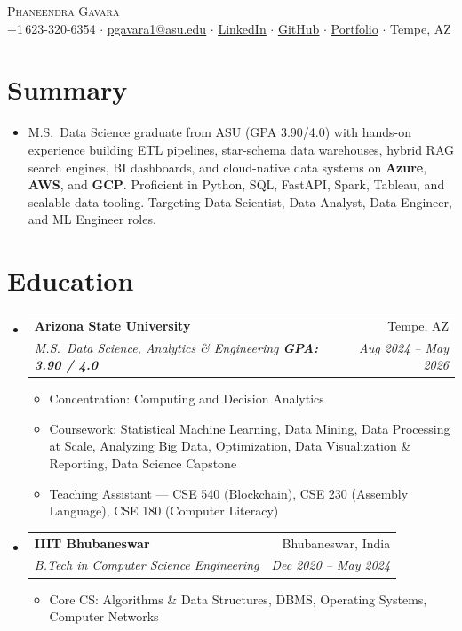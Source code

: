 \documentclass[letterpaper,10pt]{article}
\makeatletter
\newcommand{\resumeItem}[1]{\item\small{#1\vspace{-2pt}}}
\newcommand{\resumeSubheading}[4]{
  \vspace{-2pt}\item
  \begin{tabular*}{0.97\textwidth}[t]{l@{\extracolsep{\fill}}r}
    \textbf{\small#1} & \small#2 \\
    \textit{\small#3} & \textit{\small#4} \\
  \end{tabular*}\vspace{-6pt}
}
\newcommand{\resumeSubHL}{\begin{itemize}[leftmargin=0.12in,label={}]}
\newcommand{\resumeSubHLE}{\end{itemize}}
\newcommand{\resumeIL}{\begin{itemize}[leftmargin=0.18in,topsep=1pt,itemsep=0pt]}
\newcommand{\resumeILE}{\end{itemize}\vspace{-3pt}}
\makeatother
\begin{document}
\begin{center}
  {\LARGE\scshape Phaneendra Gavara}\\[3pt]
  \small
  +1\,623-320-6354 $\cdot$
  \href{mailto:pgavara1@asu.edu}{\underline{pgavara1@asu.edu}} $\cdot$
  \href{https://www.linkedin.com/in/phaneendra-gavara}{\underline{LinkedIn}} $\cdot$
  \href{https://github.com/PHANI465}{\underline{GitHub}} $\cdot$
  \href{https://phaneendragavara.dev/}{\underline{Portfolio}} $\cdot$
  Tempe, AZ
\end{center}

\vspace{-2pt}

\section{Summary}
\begin{itemize}[leftmargin=0.12in,label={},topsep=0pt]
  \small\item{
    M.S.\ Data Science graduate from ASU (GPA 3.90/4.0) with hands-on experience building ETL pipelines, star-schema data warehouses, hybrid RAG search engines, BI dashboards, and cloud-native data systems on \textbf{Azure}, \textbf{AWS}, and \textbf{GCP}. Proficient in Python, SQL, FastAPI, Spark, Tableau, and scalable data tooling. Targeting Data Scientist, Data Analyst, Data Engineer, and ML Engineer roles.
  }
\end{itemize}

\section{Education}
\resumeSubHL
  \resumeSubheading
    {Arizona State University}{Tempe, AZ}
    {M.S.\ Data Science, Analytics \& Engineering \quad \textbf{GPA: 3.90 / 4.0}}{Aug 2024 -- May 2026}
    \resumeIL
      \resumeItem{Concentration: Computing and Decision Analytics}
      \resumeItem{Coursework: Statistical Machine Learning, Data Mining, Data Processing at Scale, Analyzing Big Data, Optimization, Data Visualization \& Reporting, Data Science Capstone}
      \resumeItem{Teaching Assistant --- CSE 540 (Blockchain), CSE 230 (Assembly Language), CSE 180 (Computer Literacy)}
    \resumeILE
  \resumeSubheading
    {IIIT Bhubaneswar}{Bhubaneswar, India}
    {B.Tech in Computer Science Engineering}{Dec 2020 -- May 2024}
    \resumeIL
      \resumeItem{Core CS: Algorithms \& Data Structures, DBMS, Operating Systems, Computer Networks}
    \resumeILE
\resumeSubHLE
\end{document}
